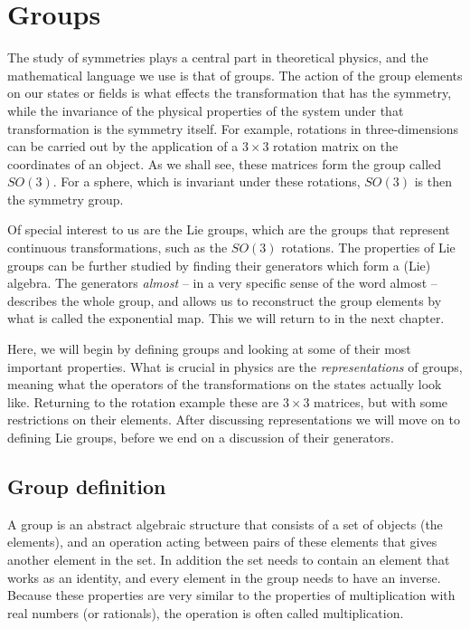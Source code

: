 \documentclass[notes.tex]{subfiles}
\begin{document}
\chapter{Groups}
\label{chap:groups}

The study of symmetries plays a central part in theoretical physics, and the mathematical language we use is that of groups. The action of the group elements on our states or fields is what effects the transformation that has the symmetry, while the invariance of the physical properties of the system under that transformation is the symmetry itself. For example, rotations in three-dimensions can be carried out by the application of a $3\times3$ rotation matrix on the coordinates of an object. As we shall see, these matrices form the group called $SO(3)$. For a sphere, which is invariant under these rotations, $SO(3)$ is then the symmetry group.

Of special interest to us are the Lie groups, which are the groups that represent continuous transformations, such as the $SO(3)$ rotations. The properties of Lie groups can be further studied by finding their generators which form a (Lie) algebra. The generators {\it almost} -- in a very specific sense of the word almost -- describes the whole group, and allows us to reconstruct the group elements by what is called the exponential map. This we will return to in the next chapter.

Here, we will begin by defining groups and looking at some of their most important properties. What is crucial in physics are the {\it representations} of groups, meaning what the operators of the transformations on the states actually look like. Returning to the rotation example these are $3\times3$ matrices, but with some restrictions on their elements. After discussing representations we will move on to defining Lie groups, before we end on a discussion of their generators.


\section{Group definition}
A group is an abstract algebraic structure that consists of a set of objects (the elements), and an operation acting between pairs of these elements that gives another element in the set. In addition the set needs to contain an element that works as an identity, and every element in the group needs to have an inverse. Because these properties are very similar to the properties of multiplication with real numbers (or rationals), the operation is often called multiplication.
\end{document}
